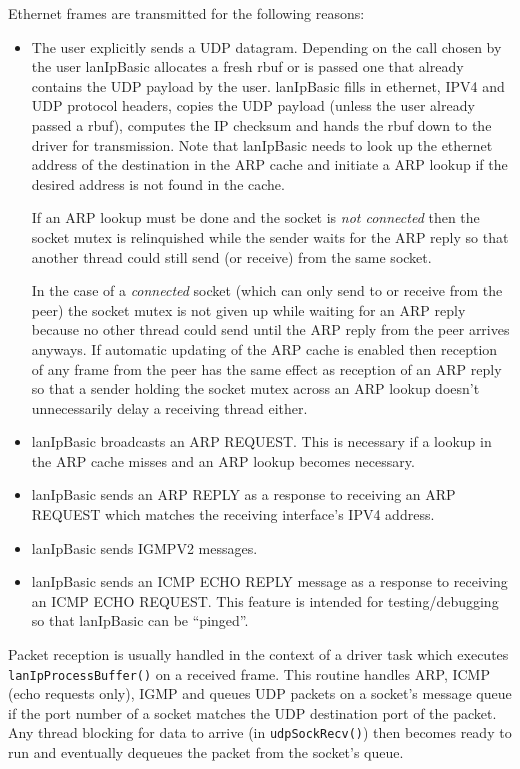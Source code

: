\documentclass{article}
\newcommand{\lip}{lanIpBasic}
\newcommand{\ethn}{ethernet}
\newcommand{\Ethn}{Ethernet}
\newcommand{\rbuf}{{rbuf}}
\newcommand{\cmd}[1]{{\tt #1}}
\begin{document}
\Ethn{} frames are transmitted for the following reasons:
\begin{itemize}
\item The user explicitly sends a UDP datagram. Depending on the call chosen
      by the user \lip{} allocates a fresh \rbuf{} or is passed one that
      already contains the UDP payload by the user. \lip{} fills in \ethn{},
      IPV4 and UDP protocol headers, copies the UDP payload (unless the
      user already passed a \rbuf{}), computes the IP checksum and hands
      the \rbuf{} down to the driver for transmission. Note that \lip{}
      needs to look up the \ethn{} address of the destination in the ARP
      cache and initiate a ARP lookup if the desired address is not found
      in the cache.

      If an ARP lookup must be done and the socket is {\em not connected}
      then the socket mutex is relinquished while the sender waits for
      the ARP reply so that another thread could still send (or receive)
      from the same socket.

      In the case of a {\em connected} socket (which can only send to
      or receive from the peer) the socket mutex is not given up while
      waiting for an ARP reply because no other thread could send until
      the ARP reply from the peer arrives anyways. If automatic updating
      of the ARP cache is enabled then reception of any frame from the
      peer has the same effect as reception of an ARP reply so that 
      a sender holding the socket mutex across an ARP lookup doesn't
      unnecessarily delay a receiving thread either.
      
\item \lip{} broadcasts an ARP REQUEST. This is necessary if a lookup
      in the ARP cache misses and an ARP lookup becomes necessary. 
\item \lip{} sends an ARP REPLY as a response to receiving an ARP REQUEST
      which matches the receiving interface's IPV4 address.
\item \lip{} sends IGMPV2 messages.
\item \lip{} sends an ICMP ECHO REPLY message as a response to receiving
      an ICMP ECHO REQUEST. This feature is intended for testing/debugging
      so that \lip{} can be ``pinged''.
\end{itemize}

Packet reception is usually handled in the context of a driver task
which executes \cmd{lanIpProcessBuffer()} on a received frame.
This routine handles ARP, ICMP (echo requests only), IGMP and queues
UDP packets on a socket's message queue if the port number of a socket
matches the UDP destination port of the packet. Any thread blocking
for data to arrive (in \cmd{udpSockRecv()}) then becomes ready to run
and eventually dequeues the packet from the socket's queue.
\end{document}
